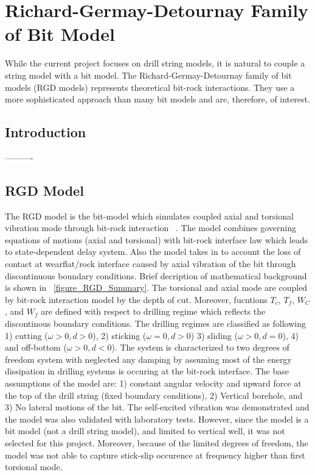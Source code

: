 \section{Richard-Germay-Detournay Family of Bit Model}
\label{ch:rgdmodels}
While the current project focuses on drill string models, it is natural to couple a string model with a bit model. The Richard-Germay-Detournay family of bit models (RGD models) represents theoretical bit-rock interactions.  They use a more sophisticated approach than many bit models and are, therefore, of interest.
\subsection{Introduction}
----------

\subsection{RGD Model}
The RGD model is the bit-model which simulates coupled axial and torsional vibration mode through bit-rock interaction ~\cite{ref:richard2007a}. The model combines governing equations of motions (axial and torsional) with bit-rock interface law which leads to state-dependent delay system. Also the model takes in to account the loss of contact at wearflat/rock interface caused by axial vibration of the bit through discontinuous boundary conditions. Brief decription of mathematical background is shown in \figurename~\ref{figure_RGD_Summary}. The torsional and axial mode are coupled by bit-rock interaction model by the depth of cut. Moreover, fucntions $T_c$, $T_f$, $W_C$, and $W_f$ are defined with respect to drilling regime which reflects the discontinous boundary conditions. The drilling regimes are classified as following 1) cutting ($\omega>0, d>0$), 2) sticking ($\omega=0, d>0$) 3) sliding ($\omega>0, d=0$), 4) and off-bottom ($\omega>0, d<0$). The system is characterized to two degrees of freedom system with neglected any damping by assuming most of the energy dissipation in drilling systems is occuring at the bit-rock interface. The base assumptions of the model are: 1) constant angular velocity and upward force at the top of the drill string (fixed boundary conditions), 2) Vertical borehole, and 3) No lateral motions of the bit. The self-excited vibration was demonstrated and the model was also validated with laboratory tests. However, since the model is a bit model (not a drill string model), and limited to vertical well, it was not selected for this project. Moreover, because of the limited degrees of freedom, the model was not able to capture stick-slip occurence at frequency higher than first torsional mode. 

